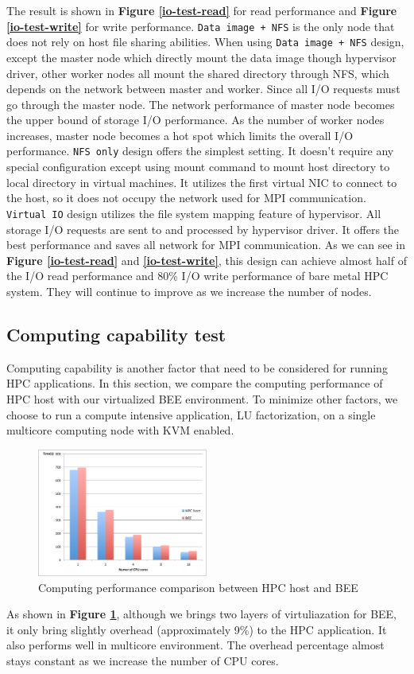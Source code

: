The result is shown in \textbf{Figure \ref{io-test-read}} for read performance and \textbf{Figure \ref{io-test-write}} for write performance. \texttt{Data image + NFS} is the only node that does not rely on host file sharing abilities. When using \texttt{Data image + NFS} design, except the master node which directly mount the data image though hypervisor driver, other worker nodes all mount the shared directory through NFS, which depends on the network between master and worker. Since all I/O requests must go through the master node. The network performance of master node becomes the upper bound of storage I/O performance. As the number of worker nodes increases, master node becomes a hot spot which limits the overall I/O performance.  \texttt{NFS only} design offers the simplest setting. It doesn't require any special configuration except using mount command to mount host directory to local directory in virtual machines. It utilizes the first virtual NIC to connect to the host, so it does not occupy the network used for MPI communication. \texttt{Virtual IO} design utilizes the file system mapping feature of hypervisor. All storage I/O requests are sent to and processed by hypervisor driver. It offers the best performance and saves all network for MPI communication. As we can see in \textbf{Figure \ref{io-test-read}} and \textbf{\ref{io-test-write}}, this design can achieve almost half of the I/O read performance and 80\% I/O write performance of bare metal HPC system. They will continue to improve as we increase the number of nodes.

\subsection{Computing capability test}
Computing capability is another factor that need to be considered for running HPC applications. In this section, we compare the computing performance of HPC host with our virtualized BEE environment. To minimize other factors, we choose to run a compute intensive application, LU factorization, on a single multicore computing node with KVM enabled.

\begin{figure}[h]
    \centering
    \caption{Computing performance comparison between HPC host and BEE}
    \label{comp-test}
    \includegraphics[width=0.5\textwidth]{figures/lu.pdf}
\end{figure}
 As shown in \textbf{Figure \ref{comp-test}}, although we brings two layers of virtuliazation for BEE, it only bring slightly overhead (approximately 9\%) to the HPC application. It also performs well in multicore environment. The overhead percentage almost stays constant as we increase the number of CPU cores.

